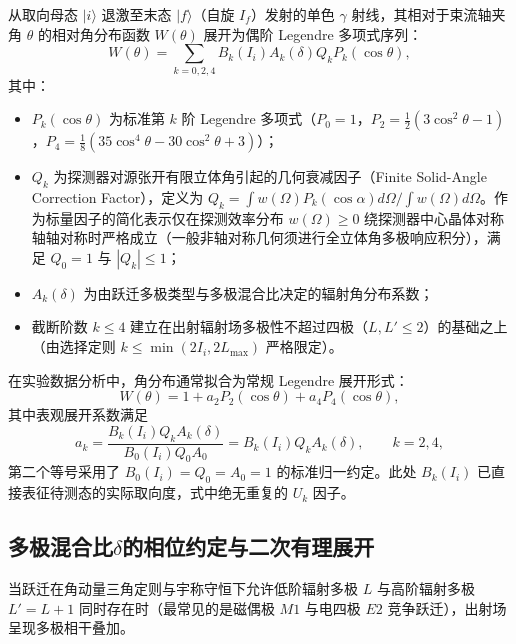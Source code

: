 从取向母态 $|i\rangle$ 退激至末态 $|f\rangle$（自旋 $I_f$）发射的单色 $\gamma$ 射线，其相对于束流轴夹角 $\theta$ 的相对角分布函数 $W(\theta)$ 展开为偶阶 Legendre 多项式序列：
\begin{equation}\label{eq:5-7-w-theta-general}
W(\theta) = \sum_{k=0, 2, 4} B_k(I_i) A_k(\delta) Q_k P_k(\cos\theta),
\end{equation}
其中：
\begin{itemize}
\item $P_k(\cos\theta)$ 为标准第 $k$ 阶 Legendre 多项式（$P_0 = 1$，$P_2 = \frac{1}{2}(3\cos^2\theta - 1)$，$P_4 = \frac{1}{8}(35\cos^4\theta - 30\cos^2\theta + 3)$）；
\item $Q_k$ 为探测器对源张开有限立体角引起的几何衰减因子（Finite Solid-Angle Correction Factor），定义为 $Q_k = \int w(\Omega) P_k(\cos\alpha) d\Omega / \int w(\Omega) d\Omega$。作为标量因子的简化表示仅在探测效率分布 $w(\Omega) \ge 0$ 绕探测器中心晶体对称轴轴对称时严格成立（一般非轴对称几何须进行全立体角多极响应积分），满足 $Q_0 = 1$ 与 $|Q_k| \le 1$；
\item $A_k(\delta)$ 为由跃迁多极类型与多极混合比决定的辐射角分布系数；
\item 截断阶数 $k \le 4$ 建立在出射辐射场多极性不超过四极（$L, L' \le 2$）的基础之上（由选择定则 $k \le \min(2I_i, 2L_{\max})$ 严格限定）。
\end{itemize}
在实验数据分析中，角分布通常拟合为常规 Legendre 展开形式：
\begin{equation}\label{eq:5-7-w-theta-fit}
W(\theta) = 1 + a_2 P_2(\cos\theta) + a_4 P_4(\cos\theta),
\end{equation}
其中表观展开系数满足
\begin{equation}\label{eq:5-7-ak-apparent}
a_k = \frac{B_k(I_i) Q_k A_k(\delta)}{B_0(I_i) Q_0 A_0} = B_k(I_i) Q_k A_k(\delta),\qquad k=2,4,
\end{equation}
第二个等号采用了 $B_0(I_i) = Q_0 = A_0 = 1$ 的标准归一约定。此处 $B_k(I_i)$ 已直接表征待测态的实际取向度，式中绝无重复的 $U_k$ 因子。

\subsection{多极混合比$\delta$的相位约定与二次有理展开}\label{subsec:5-7-2}

当跃迁在角动量三角定则与宇称守恒下允许低阶辐射多极 $L$ 与高阶辐射多极 $L' = L + 1$ 同时存在时（最常见的是磁偶极 $M1$ 与电四极 $E2$ 竞争跃迁），出射场呈现多极相干叠加。

